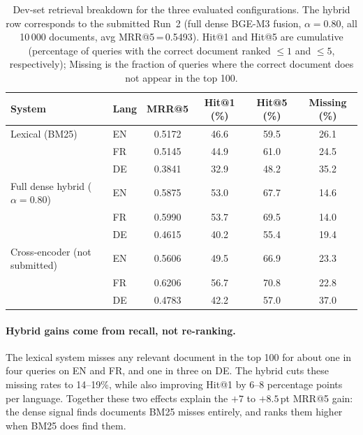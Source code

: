 \begin{table}[!ht]
    \caption{Dev-set retrieval breakdown for the three evaluated configurations. The hybrid row corresponds to the submitted Run~2 (full dense BGE-M3 fusion, $\alpha{=}0.80$, all 10\,000 documents, avg MRR@5\,=\,0.5493). Hit@1 and Hit@5 are cumulative (percentage of queries with the correct document ranked $\leq\!1$ and $\leq\!5$, respectively); Missing is the fraction of queries where the correct document does not appear in the top 100.}
    \label{tab:dev-breakdown}
    \centering
    \begin{tabular}{llcccc}
        \toprule
        System & Lang & MRR@5 & Hit@1 (\%) & Hit@5 (\%) & Missing (\%) \\
        \midrule
        Lexical (BM25)              & EN & 0.5172 & 46.6 & 59.5 & 26.1 \\
                                    & FR & 0.5145 & 44.9 & 61.0 & 24.5 \\
                                    & DE & 0.3841 & 32.9 & 48.2 & 35.2 \\
        \midrule
        Full dense hybrid ($\alpha{=}0.80$) & EN & 0.5875 & 53.0 & 67.7 & 14.6 \\
                                           & FR & 0.5990 & 53.7 & 69.5 & 14.0 \\
                                           & DE & 0.4615 & 40.2 & 55.4 & 19.4 \\
        \midrule
        Cross-encoder (not submitted) & EN & 0.5606 & 49.5 & 66.9 & 23.3 \\
                                      & FR & 0.6206 & 56.7 & 70.8 & 22.8 \\
                                      & DE & 0.4783 & 42.2 & 57.0 & 37.0 \\
        \bottomrule
    \end{tabular}
\end{table}

\paragraph{Hybrid gains come from recall, not re-ranking.}
The lexical system misses any relevant document in the top 100 for about one in four queries on EN and FR, and one in three on DE\@. The hybrid cuts these missing rates to 14--19\%, while also improving Hit@1 by 6--8 percentage points per language. Together these two effects explain the $+7$ to $+8.5$\,pt MRR@5 gain: the dense signal finds documents BM25 misses entirely, and ranks them higher when BM25 does find them.

